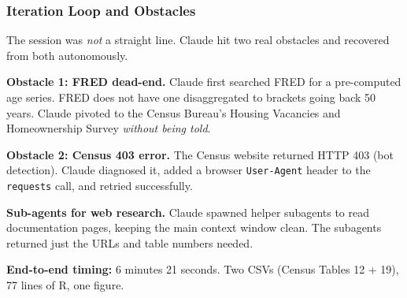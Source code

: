 \documentclass[10pt,english,aspectratio=169]{beamer}
\begin{document}
\begin{frame}
\frametitle{Iteration Loop and Obstacles}

The session was \textit{not} a straight line. Claude hit two real obstacles and recovered from both autonomously.

\vspace{0.3cm}

\textbf{Obstacle 1: FRED dead-end.}
Claude first searched FRED for a pre-computed age series. FRED does not have one disaggregated to brackets going back 50 years. Claude pivoted to the Census Bureau's Housing Vacancies and Homeownership Survey \textit{without being told}.

\vspace{0.3cm}

\textbf{Obstacle 2: Census 403 error.}
The Census website returned HTTP 403 (bot detection). Claude diagnosed it, added a browser \texttt{User-Agent} header to the \texttt{requests} call, and retried successfully.

\vspace{0.3cm}

\textbf{Sub-agents for web research.} Claude spawned helper subagents to read documentation pages, keeping the main context window clean. The subagents returned just the URLs and table numbers needed.

\vspace{0.2cm}

\textbf{End-to-end timing:} 6 minutes 21 seconds. Two CSVs (Census Tables 12 + 19), 77 lines of R, one figure.
\end{frame}
\end{document}
